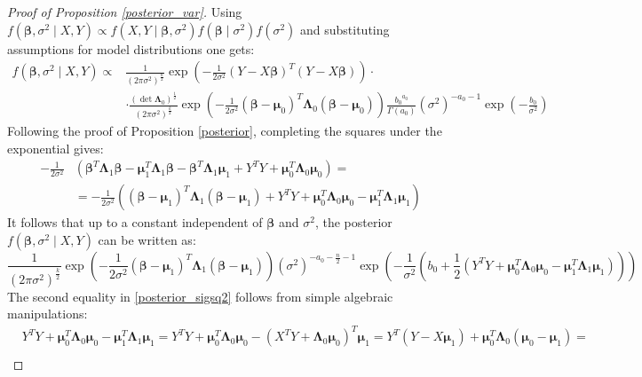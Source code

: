 \documentclass[10pt,fleqn]{amsart}
\theoremstyle{definition}
\theoremstyle{remark}
\numberwithin{equation}{section}
\newcommand{\bbeta}{\boldsymbol{\beta}}
\newcommand{\mmu}{\boldsymbol{\mu}}
\newcommand{\LLambda}{\boldsymbol{\Lambda}}
\newcommand{\XTY}{X^TY}
\begin{document}
\begin{proof}[Proof of Proposition \ref{posterior_var}]
Using $f(\bbeta, \sigma^2\mid X, Y)\propto f(X, Y\mid \bbeta, \sigma^2)f(\bbeta\mid\sigma^2)f(\sigma^2)$ and
substituting assumptions for model distributions one gets:
\begin{equation}\label{posterior_var_pf1}\begin{split}
    f(\bbeta,\sigma^2\mid X, Y)\propto&\frac 1 {\left(2\pi\sigma^2\right)^{\frac n 2}}
    \exp\left(-\frac 1{2\sigma^2}\left(Y-X\bbeta\right)^T\left(Y-X\bbeta\right)\right)\cdot\\
    &\cdot\frac{\left(\det\LLambda_0\right)^{\frac 12}}{\left(2\pi\sigma^2\right)^{\frac{k}2}}
    \exp\left(-\frac 1{2\sigma^2}(\bbeta-\mmu_0)^T\LLambda_0(\bbeta-\mmu_0)\right)
    \frac{{b_0}^{a_0}}{\Gamma(a_0)}\left(\sigma^2\right)^{-a_0-1}\exp\left(-\frac{b_0}{\sigma^2}\right)
\end{split}\end{equation}
Following the proof of Proposition \ref{posterior}, completing the squares under the exponential gives:
\begin{equation*}\begin{split}
    -\frac 1{2\sigma^2}&\left(\bbeta^T\LLambda_1\bbeta-\mmu_1^T\LLambda_1\bbeta-\bbeta^T\LLambda_1\mmu_1+Y^TY+\mmu_0^T\LLambda_0\mmu_0\right)=\\
    &=-\frac 1{2\sigma^2}\left((\bbeta-\mmu_1)^T\LLambda_1(\bbeta-\mmu_1)+Y^TY+\mmu_0^T\LLambda_0\mmu_0-\mmu_1^T\LLambda_1\mmu_1\right)
\end{split}\end{equation*}
It follows that up to a constant independent of $\bbeta$ and $\sigma^2$, the posterior $f(\bbeta,\sigma^2\mid X, Y)$ can be written as:
\begin{equation*}
    \frac 1{\left(2\pi\sigma^2\right)^{\frac{k}2}}
    \exp\left(-\frac 1{2\sigma^2}(\bbeta-\mmu_1)^T\LLambda_1(\bbeta-\mmu_1)\right)
    \left(\sigma^2\right)^{-a_0-\frac n 2 -1}\exp\left(-\frac{1}{\sigma^2}\left(b_0+\frac 12 
    \left(Y^TY+\mmu_0^T\LLambda_0\mmu_0-\mmu_1^T\LLambda_1\mmu_1\right)
    \right)\right)
\end{equation*}
The second equality in \ref{posterior_sigsq2} follows from simple algebraic manipulations:
\begin{equation*}\begin{split}
    &Y^TY+\mmu_0^T\LLambda_0\mmu_0-\mmu_1^T\LLambda_1\mmu_1=
    Y^TY+\mmu_0^T\LLambda_0\mmu_0-\left(\XTY+\LLambda_0\mmu_0\right)^T\mmu_1=
    Y^T\left(Y-X\mmu_1\right)+\mmu_0^T\LLambda_0\left(\mmu_0-\mmu_1\right)=\\

\end{split}
\end{equation*}
\end{proof}
\end{document}
